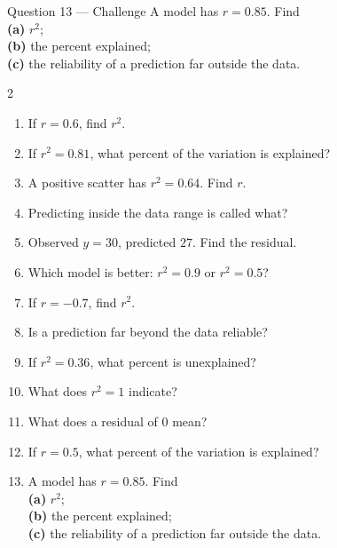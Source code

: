 \documentclass[11pt]{article}
\begin{document}
\begin{qbox}{Question 13 --- Challenge}
A model has $r=0.85$. Find \\ \textbf{(a)} $r^{2}$; \\ \textbf{(b)} the percent explained; \\ \textbf{(c)} the reliability of a prediction far outside the data.\workspace{3cm}
\end{qbox}

\clearpage
{}

\begin{recapbox}
\begin{multicols}{2}
\small
\begin{enumerate}[leftmargin=*,itemsep=3pt]
  \item If $r=0.6$, find $r^{2}$.
  \item If $r^{2}=0.81$, what percent of the variation is explained?
  \item A positive scatter has $r^{2}=0.64$. Find $r$.
  \item Predicting inside the data range is called what?
  \item Observed $y=30$, predicted $27$. Find the residual.
  \item Which model is better: $r^{2}=0.9$ or $r^{2}=0.5$?
  \item If $r=-0.7$, find $r^{2}$.
  \item Is a prediction far beyond the data reliable?
  \item If $r^{2}=0.36$, what percent is unexplained?
  \item What does $r^{2}=1$ indicate?
  \item What does a residual of $0$ mean?
  \item If $r=0.5$, what percent of the variation is explained?
  \item A model has $r=0.85$. Find \\ \textbf{(a)} $r^{2}$; \\ \textbf{(b)} the percent explained; \\ \textbf{(c)} the reliability of a prediction far outside the data.
\end{enumerate}
\end{multicols}
\end{recapbox}
\end{document}
